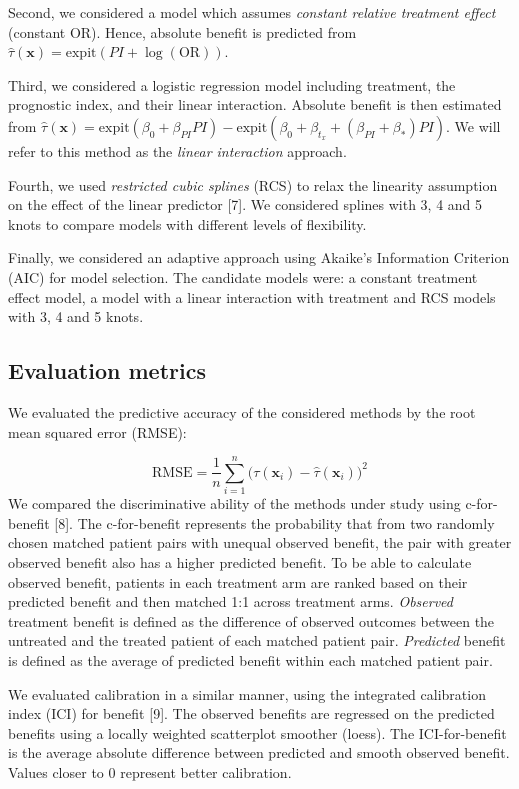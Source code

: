 \documentclass{article}
\begin{document}
Second, we considered a model which assumes \emph{constant relative
treatment effect} (constant OR). Hence, absolute benefit is predicted
from \(\hat{\tau}(\bm{x}) = \text{expit}(PI +\log(\text{OR}))\).

Third, we considered a logistic regression model including treatment,
the prognostic index, and their linear interaction. Absolute benefit is
then estimated from
\(\hat{\tau}(\bm{x})=\text{expit}(\beta_0+\beta_{PI}PI) - \text{expit}(\beta_0+\beta_{t_x}+(\beta_{PI}+\beta_*)PI)\).
We will refer to this method as the \emph{linear interaction} approach.

Fourth, we used \emph{restricted cubic splines} (RCS) to relax the
linearity assumption on the effect of the linear predictor {[}7{]}. We
considered splines with 3, 4 and 5 knots to compare models with
different levels of flexibility.

Finally, we considered an adaptive approach using Akaike's Information
Criterion (AIC) for model selection. The candidate models were: a
constant treatment effect model, a model with a linear interaction with
treatment and RCS models with 3, 4 and 5 knots.

\hypertarget{evaluation-metrics}{%
\subsection{Evaluation metrics}\label{evaluation-metrics}}

We evaluated the predictive accuracy of the considered methods by the
root mean squared error (RMSE):

\[\text{RMSE}=\frac{1}{n}\sum_{i=1}^n\big(\tau(\bm{x}_i) - \hat{\tau}(\bm{x}_i)\big)^2\]
We compared the discriminative ability of the methods under study using
c-for-benefit {[}8{]}. The c-for-benefit represents the probability that
from two randomly chosen matched patient pairs with unequal observed
benefit, the pair with greater observed benefit also has a higher
predicted benefit. To be able to calculate observed benefit, patients in
each treatment arm are ranked based on their predicted benefit and then
matched 1:1 across treatment arms. \emph{Observed} treatment benefit is
defined as the difference of observed outcomes between the untreated and
the treated patient of each matched patient pair. \emph{Predicted}
benefit is defined as the average of predicted benefit within each
matched patient pair.

We evaluated calibration in a similar manner, using the integrated
calibration index (ICI) for benefit {[}9{]}. The observed benefits are
regressed on the predicted benefits using a locally weighted scatterplot
smoother (loess). The ICI-for-benefit is the average absolute difference
between predicted and smooth observed benefit. Values closer to \(0\)
represent better calibration.
\end{document}

